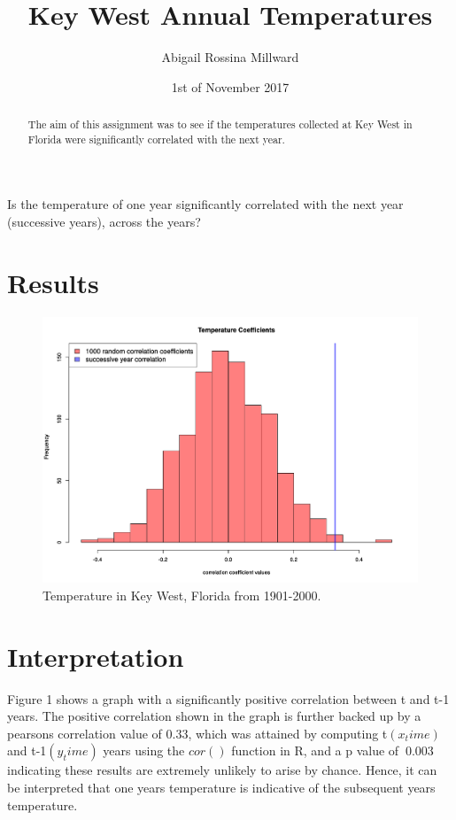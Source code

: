 \documentclass[12pt]{article}
\title{Key West Annual Temperatures}
\author{Abigail Rossina Millward}
\date{1st of November 2017}
\begin{document}
	\maketitle
	Is the temperature of one year significantly correlated with the next year (successive years), across the years?
	
	\begin{abstract}
		The aim of this assignment was to see if the temperatures collected
		at Key West in Florida were significantly correlated with the next year.
	\end{abstract}
	
	\section{Results}
		
	\begin{figure}[H]
			\centering
	\includegraphics[scale=.4]{TAutoCorr1.pdf}
			\caption{Temperature in Key West, Florida from 1901-2000.}
	\label{fig:TAutoCorrsvg1}
	\end{figure}

	\section{Interpretation}
	Figure 1 shows a graph with a significantly positive correlation between t and t-1 years. The positive correlation shown in the graph is further backed up by a pearsons correlation value of 0.33, which was attained by computing t$(x_time)$ and t-1$(y_time)$ years using the $cor()$ function in R, and a p value of $~ 0.003$ indicating these results are extremely unlikely to arise by chance. Hence, it can be interpreted that one years temperature is indicative of the subsequent years temperature.
	
	
\end{document}
